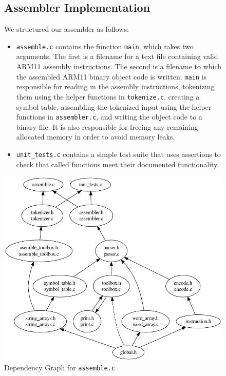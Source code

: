 \documentclass[10pt]{article}
\begin{document}
\begin{figure}[H]
\begin{minipage}{0.5\linewidth}

\subsection{Assembler Implementation}

We structured our assembler as follows:

\begin{itemize}
\item \texttt{assemble.c} contains the function \texttt{main}, which takes two arguments. The first is a filename for a text file containing valid ARM11 assembly instructions. The second is a filename to which the assembled ARM11 binary object code is written. \texttt{main} is responsible for reading in the assembly instructions, tokenizing them using the helper functions in \texttt{tokenize.c}, creating a symbol table, assembling the tokenized input using the helper functions in \texttt{assembler.c}, and writing the object code to a binary file. It is also responsible for freeing any remaining allocated memory in order to avoid memory leaks.
\item \texttt{unit\_tests.c} contains a simple test suite that uses assertions to check that called functions meet their documented functionality.
\end{itemize}

\end{minipage}
\hspace{0.05\linewidth}
\begin{minipage}{0.45\linewidth}

\centering
\includegraphics[scale=0.28]{Report/assemble.png}
\caption{Dependency Graph for \texttt{assemble.c}}

\end{minipage}
\end{figure}
\end{document}
